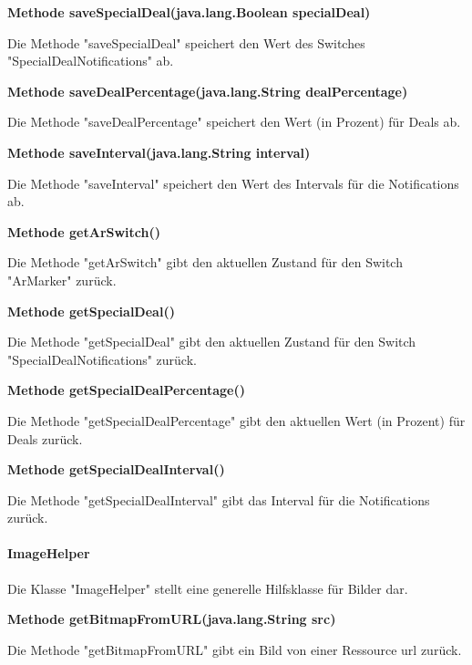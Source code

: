 \documentclass{scrartcl}
\begin{document}
\noindent\textbf{Methode saveSpecialDeal(java.lang.Boolean specialDeal)}

\noindent Die Methode "saveSpecialDeal" speichert den Wert des Switches "SpecialDealNotifications" ab. \newline 

\noindent\textbf{Methode saveDealPercentage(java.lang.String dealPercentage)}

\noindent Die Methode "saveDealPercentage" speichert den Wert (in Prozent) für Deals ab. \newline 

\noindent\textbf{Methode saveInterval(java.lang.String interval)}

\noindent Die Methode "saveInterval" speichert den Wert des Intervals für die Notifications ab. \newline 

\noindent\textbf{Methode getArSwitch()}

\noindent Die Methode "getArSwitch" gibt den aktuellen Zustand für den Switch "ArMarker" zurück. \newline 

\noindent\textbf{Methode getSpecialDeal()}

\noindent Die Methode "getSpecialDeal" gibt den aktuellen Zustand für den Switch "SpecialDealNotifications" zurück. \newline 

\noindent\textbf{Methode getSpecialDealPercentage()}

\noindent Die Methode "getSpecialDealPercentage" gibt den aktuellen Wert (in Prozent) für Deals zurück. \newline 

\noindent\textbf{Methode getSpecialDealInterval()}

\noindent Die Methode "getSpecialDealInterval" gibt das Interval für die Notifications zurück. \newline 


\paragraph{ImageHelper}
Die Klasse "ImageHelper" stellt eine generelle Hilfsklasse für Bilder dar. \newline 

\noindent\textbf{Methode getBitmapFromURL(java.lang.String src)}

\noindent Die Methode "getBitmapFromURL" gibt ein Bild von einer Ressource url zurück. \newline 
\end{document}

